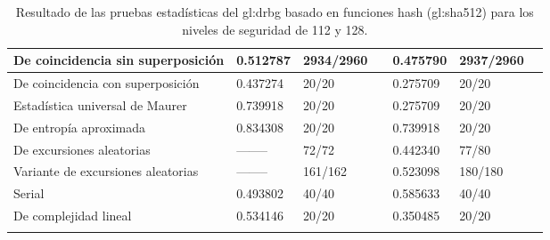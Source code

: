 \begin{longtable}{| m{2.4in} | C{0.65in} | C{0.85in} |
C{0.15in} | C{0.65in} | C{0.85in} | C{0.15in} |}
  De coincidencia sin superposición &
  0.512787 & 2934/2960 &  &
  0.475790 & 2937/2960 &  \\\hline

  De coincidencia con superposición &
  0.437274 &   20/20   &  &
  0.275709 &   20/20   &  \\\hline

  Estadística universal de Maurer &
  0.739918 &   20/20   &  &
  0.275709 &   20/20   &  \\\hline

  De entropía aproximada &
  0.834308 &   20/20   &  &
  0.739918 &   20/20   &  \\\hline

  De excursiones aleatorias &
  -------- &   72/72   &  &
  0.442340 &   77/80   &  \\\hline

  Variante de excursiones aleatorias &
  -------- &  161/162  &  &
  0.523098 &  180/180  &  \\\hline

  Serial &
  0.493802 &   40/40   &  &
  0.585633 &   40/40   &  \\\hline

  De complejidad lineal &
  0.534146 &   20/20   &  &
  0.350485 &   20/20   &  \\\hline

  \caption{Resultado de las pruebas estadísticas del \gls{gl:drbg} basado en
  funciones hash (\gls{gl:sha}512) para los niveles de seguridad de 112 y 128.}
  \label{resultados_pruebas_drbg_sha512_112_128}

\end{longtable}


